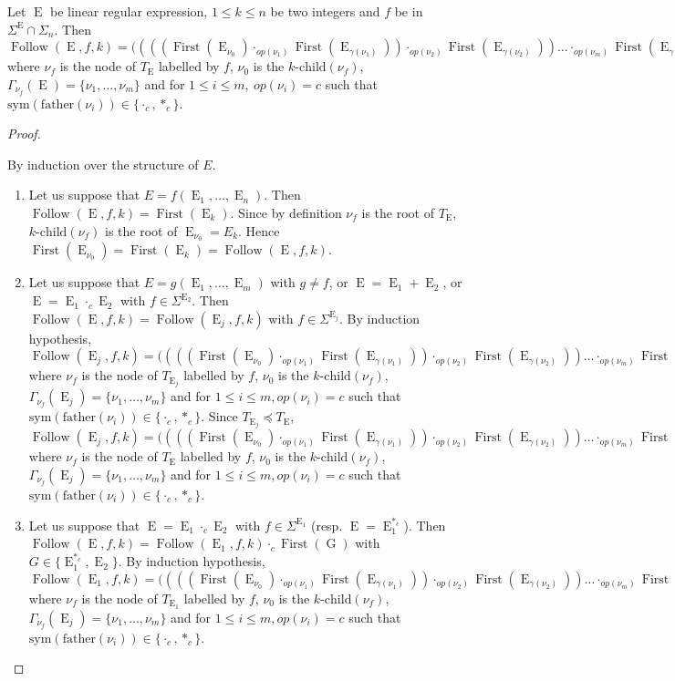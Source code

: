\documentclass{llncs}
\DeclareMathOperator{\First}{First}
\DeclareMathOperator{\Follow}{Follow}
\DeclareMathOperator{\E}{E}
\DeclareMathOperator{\G}{G}
\begin{document}
\begin{proposition}\label{b}
Let $\E$ be linear regular expression, $1\leq k\leq n$ be two integers and $f$ be in $\Sigma^{\E}\cap\Sigma_n$. Then $\Follow(\E,f,k)= ((((\First(\E_{\nu_0})\cdot_{op(\nu_1)} \First(\E_{\gamma(\nu_1)}))\cdot_{op(\nu_2)} \First(\E_{\gamma(\nu_2)}))
\dots \cdot_{op(\nu_{m})} \First(\E_{\gamma(\nu_m)}))$ where $\nu_f$ is the node of $T_{\E}$ labelled by $f$, $\nu_0$ is the $k\mbox{-}\mathrm{child}(\nu_{f})$, $\Gamma_{\nu_{f}}(\E)=\{\nu_1, \dots,\nu_m \}$ and for $1\leq i\leq m,~op(\nu_i)=c$ such that $\mathrm{sym}(\mathrm{father}(\nu_i)) \in \{\cdot_c,{*_c}\}$.
\end{proposition}
\begin{proof}
\begin{sloppy}
  By induction over the structure of $E$.
  \begin{enumerate}
    \item Let us suppose that $E=f(\E_1,\ldots,\E_n)$. Then $\Follow(\E,f,k)=\First(\E_k)$. Since by definition $\nu_f$ is the root of $T_{\E}$, $k\mbox{-}\mathrm{child}(\nu_{f})$ is the root of $\E_{\nu_0}=E_k$. Hence $\First(\E_{\nu_0})=\First(\E_k)= \Follow(\E,f,k)$.
    \item Let us suppose that $E=g(\E_1,\ldots,\E_m)$ with $g\neq f$, or $\E=\E_1+\E_2$, or $\E=\E_1 \cdot_c \E_2$ with $f\in \Sigma^{\E_2}$. Then $\Follow(\E,f,k)=\Follow(\E_j,f,k)$ with $f\in \Sigma^{\E_j}$. By induction hypothesis, $\Follow(\E_j,f,k)=((((\First(\E_{\nu_0}) \cdot_{op(\nu_1)} \First(\E_{\gamma(\nu_1)}))\cdot_{op(\nu_2)} \First(\E_{\gamma(\nu_2)})) \dots \cdot_{op(\nu_{m})} \First(\E_{\gamma(\nu_m)}))$ where $\nu_f$ is the node of $T_{\E_j}$ labelled by $f$, $\nu_0$ is the $k\mbox{-}\mathrm{child}(\nu_{f})$, $\Gamma_{\nu_{f}}(\E_j)=\{\nu_1, \dots,\nu_m \}$ and for $1\leq i\leq m,op(\nu_i)=c$ such that $\mathrm{sym}(\mathrm{father}(\nu_i)) \in \{\cdot_c,{*_c}\}$. Since $T_{\E_j} \preccurlyeq T_{\E}$, $\Follow(\E_j,f,k)=((((\First(\E_{\nu_0}) \cdot_{op(\nu_1)} \First(\E_{\gamma(\nu_1)}))\cdot_{op(\nu_2)} \First(\E_{\gamma(\nu_2)})) \dots \cdot_{op(\nu_{m})} \First(\E_{\gamma(\nu_m)}))$ where $\nu_f$ is the node of $T_{\E}$ labelled by $f$, $\nu_0$ is the $k\mbox{-}\mathrm{child}(\nu_{f})$, $\Gamma_{\nu_{f}}(\E_j)=\{\nu_1, \dots,\nu_m \}$ and for $1\leq i\leq m,op(\nu_i)=c$ such that 
$\mathrm{sym}(\mathrm{father}(\nu_i)) \in \{\cdot_c,{*_c}\}$.    
    \item Let us suppose that $\E=\E_1 \cdot_c \E_2$ with $f\in\Sigma^{\E_1} $ (resp. $\E=\E_1^{*_c}$). Then $\Follow(\E,f,k)=\Follow(\E_1,f,k)\cdot_c \First(\G )$ with $G\in\{\E_1^{*_c},\E_2\}$. By induction hypothesis, $\Follow(\E_1,f,k)= ((((\First(\E_{\nu_0})\cdot_{op(\nu_1)} \First(\E_{\gamma(\nu_1)}))\cdot_{op(\nu_2)} \First(\E_{\gamma(\nu_2)})) \dots \cdot_{op(\nu_{m})} \First(\E_{\gamma(\nu_m)}))$ where $\nu_f$ is the node of $T_{\E_1}$ labelled by $f$, $\nu_0$ is the $k\mbox{-}\mathrm{child}(\nu_{f})$, $\Gamma_{\nu_{f}}(\E_j)=\{\nu_1, \dots,\nu_m \}$ and for $1\leq i\leq m,op(\nu_i)=c$ such that $\mathrm{sym}(\mathrm{father}(\nu_i)) \in \{\cdot_c,{*_c}\}$. 
    

\end{enumerate}
\end{sloppy}
\end{proof}
\end{document}
